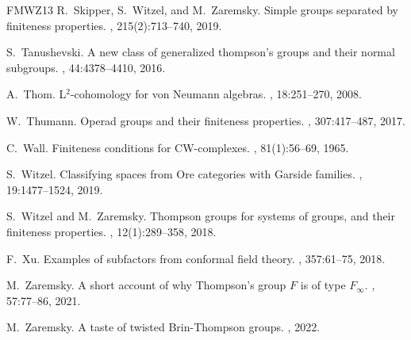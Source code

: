 \documentclass[a4paper, 12pt]{amsart}
\numberwithin{equation}{section}
\theoremstyle{definition}
\begin{document}
\begin{thebibliography}{FMWZ13}
R.~Skipper, S.~Witzel, and M.~Zaremsky.
\newblock Simple groups separated by finiteness properties.
, 215(2):713--740, 2019.

S.~Tanushevski.
\newblock A new class of generalized thompson's groups and their normal
  subgroups.
, 44:4378--4410, 2016.

A.~Thom.
\newblock L$^2$-cohomology for von {N}eumann algebras.
, 18:251--270, 2008.

W.~Thumann.
\newblock Operad groups and their finiteness properties.
, 307:417--487, 2017.

C.~Wall.
\newblock Finiteness conditions for {CW}-complexes.
, 81(1):56--69, 1965.

S.~Witzel.
\newblock Classifying spaces from {O}re categories with {G}arside families.
, 19:1477--1524, 2019.

S.~Witzel and M.~Zaremsky.
\newblock Thompson groups for systems of groups, and their finiteness
  properties.
, 12(1):289--358, 2018.

F.~Xu.
\newblock Examples of subfactors from conformal field theory.
, 357:61--75, 2018.

M.~Zaremsky.
\newblock A short account of why {T}hompson's group ${F}$ is of type
  ${F}_\infty$.
, 57:77--86, 2021.

M.~Zaremsky.
\newblock A taste of twisted {B}rin-{T}hompson groups.
, 2022.

\end{thebibliography}
\end{document}

